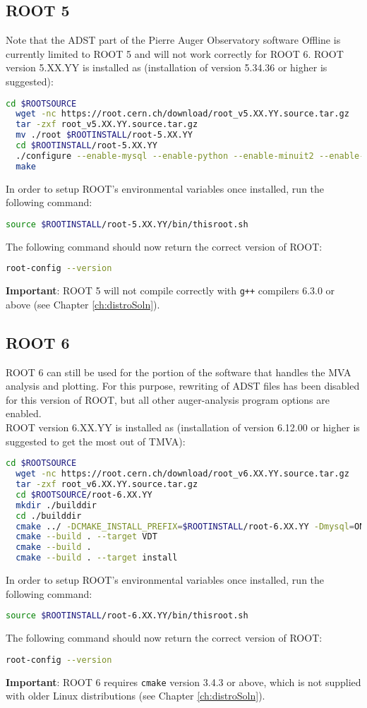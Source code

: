 \documentclass[12pt,a4paper]{report}
\begin{document}
\subsection{ROOT 5}
Note that the ADST part of the Pierre Auger Observatory software Offline \cite{offline} is currently limited to ROOT 5 and will not work correctly for ROOT 6. ROOT version 5.XX.YY is installed as (installation of version 5.34.36 or higher is suggested):
\begin{lstlisting}[language=bash]
  cd $ROOTSOURCE
  wget -nc https://root.cern.ch/download/root_v5.XX.YY.source.tar.gz
  tar -zxf root_v5.XX.YY.source.tar.gz
  mv ./root $ROOTINSTALL/root-5.XX.YY
  cd $ROOTINSTALL/root-5.XX.YY
  ./configure --enable-mysql --enable-python --enable-minuit2 --enable-roofit --enable-tmva --enable-xml --enable-builtin-freetype
  make
\end{lstlisting}
In order to setup ROOT's environmental variables once installed, run the following command:
\begin{lstlisting}[language=bash]
  source $ROOTINSTALL/root-5.XX.YY/bin/thisroot.sh
\end{lstlisting}
The following command should now return the correct version of ROOT:
\begin{lstlisting}[language=bash]
  root-config --version
\end{lstlisting}
\textbf{Important}: ROOT 5 will not compile correctly with \texttt{g++} compilers 6.3.0 or above (see Chapter \ref{ch:distroSoln}).
\subsection{ROOT 6}
ROOT 6 can still be used for the portion of the software that handles the MVA analysis and plotting. For this purpose, rewriting of ADST files has been disabled for this version of ROOT, but all other auger-analysis program options are enabled.\\
ROOT version 6.XX.YY is installed as (installation of version 6.12.00 or higher is suggested to get the most out of TMVA):
\begin{lstlisting}[language=bash]
  cd $ROOTSOURCE
  wget -nc https://root.cern.ch/download/root_v6.XX.YY.source.tar.gz
  tar -zxf root_v6.XX.YY.source.tar.gz
  cd $ROOTSOURCE/root-6.XX.YY
  mkdir ./builddir
  cd ./builddir
  cmake ../ -DCMAKE_INSTALL_PREFIX=$ROOTINSTALL/root-6.XX.YY -Dmysql=ON -Dpython=ON -Dminuit2=ON -Droofit=ON -Dtmva=ON -Dxml=ON -Dbuiltin-freetype=ON
  cmake --build . --target VDT
  cmake --build .
  cmake --build . --target install
\end{lstlisting}
In order to setup ROOT's environmental variables once installed, run the following command:
\begin{lstlisting}[language=bash]
  source $ROOTINSTALL/root-6.XX.YY/bin/thisroot.sh
\end{lstlisting}
The following command should now return the correct version of ROOT:
\begin{lstlisting}[language=bash]
  root-config --version
\end{lstlisting}
\textbf{Important}: ROOT 6 requires \texttt{cmake} version 3.4.3 or above, which is not supplied with older Linux distributions (see Chapter \ref{ch:distroSoln}).
\end{document}
